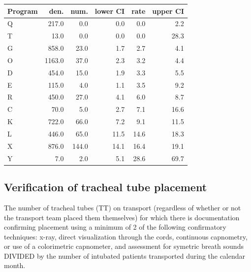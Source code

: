 \documentclass[twoside]{article}\usepackage[]{graphicx}\usepackage[]{color}
\begin{document}
\begin{table}[ht]
\centering
\begin{tabular}{lrrrrr}
  \hline
Program & den. & num. & lower CI & rate & upper CI \\ 
  \hline
Q & 217.0 & 0.0 & 0.0 & 0.0 & 2.2 \\ 
  T & 13.0 & 0.0 & 0.0 & 0.0 & 28.3 \\ 
  G & 858.0 & 23.0 & 1.7 & 2.7 & 4.1 \\ 
  O & 1163.0 & 37.0 & 2.3 & 3.2 & 4.4 \\ 
  D & 454.0 & 15.0 & 1.9 & 3.3 & 5.5 \\ 
  E & 115.0 & 4.0 & 1.1 & 3.5 & 9.2 \\ 
  R & 450.0 & 27.0 & 4.1 & 6.0 & 8.7 \\ 
  C & 70.0 & 5.0 & 2.7 & 7.1 & 16.6 \\ 
  K & 722.0 & 66.0 & 7.2 & 9.1 & 11.5 \\ 
  L & 446.0 & 65.0 & 11.5 & 14.6 & 18.3 \\ 
  X & 876.0 & 144.0 & 14.1 & 16.4 & 19.1 \\ 
  Y & 7.0 & 2.0 & 5.1 & 28.6 & 69.7 \\ 
   \hline
\end{tabular}
\end{table}




\newpage
\subsection{Verification of tracheal tube placement}
The number of tracheal tubes (TT) on transport (regardless of whether or not the transport team placed them themselves) for which there is documentation confirming placement using a minimum of 2 of the following confirmatory techniques: x-ray, direct visualization through the cords, continuous capnometry, or use of a colorimetric capnometer, and assessment for symetric breath sounds DIVIDED by the number of intubated patients transported during the calendar month.
\end{document}
